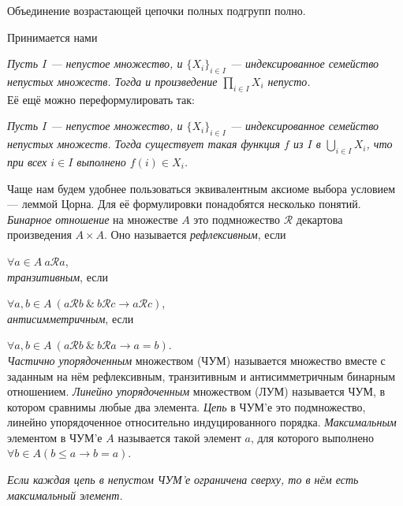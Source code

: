 \documentclass[10pt,a4paper]{article}%
\begin{document}
\begin{fact}
Объединение возрастающей цепочки полных подгрупп полно.
\end{fact}

Принимается нами

\vskip 2pt
{\sl Пусть $I$
--- непустое множество, и $\{X_i\}_{i\in I}$ --- индексированное
семейство непустых множеств. Тогда и произведение
$\prod\limits_{i\in I}X_i$ непусто.}
\\ Её ещё можно переформулировать так:
\par {\sl Пусть $I$ --- непустое множество, и $\{X_i\}_{i\in I}$ ---
индексированное семейство непустых множеств. Тогда существует
такая функция $f$ из $I$ в $\bigcup\limits_{i\in I}X_i$, что при
всех $i\in I$ выполнено $f(i)\in X_i$.}

Чаще нам будем удобнее пользоваться эквивалентным аксиоме выбора
условием --- леммой Цорна. Для её формулировки понадобятся
несколько понятий. \emph{Бинарное
отношение} на множестве $A$ это
подмножество $\mathcal{R}$ декартова произведения $A\times A$. Оно
называется {\em рефлексивным}, если

\hfil$\forall a\in A~a\mathcal{R}a$,\hfil\\ {\em
транзитивным}, если

\hfil$\forall a,b\in A~
(a\mathcal{R}b~\&~b\mathcal{R}c\rightarrow a\mathcal{R}c)$,\hfil\\
{\em антисимметричным}, если

\hfil$\forall a,b\in A~ (a\mathcal{R}b~\&~
b\mathcal{R}a\rightarrow a=b)$.\hfil\\ {\em Частично
упорядоченным}
множеством (ЧУМ) называется множество вместе с заданным на нём
рефлексивным, транзитивным и антисимметричным бинарным отношением.
{\em Линейно упорядоченным} множеством (ЛУМ) называется ЧУМ, в котором сравнимы любые
два элемента. {\em Цепь} в ЧУМ'е это подмножество,
линейно упорядоченное относительно индуцированного порядка. {\em
Максимальным} элементом в ЧУМ'е $A$
называется такой элемент $a$, для которого выполнено $\forall b\in
A (b\leqslant a \rightarrow b=a)$.

\vskip 2pt {\sl Если
каждая цепь в непустом ЧУМ'е ограничена сверху, то в нём есть
максимальный элемент.}
\end{document}
